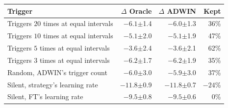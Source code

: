 \begin{tabular}{@{}lrrr@{}}
\toprule
Trigger & $\Delta$ Oracle & $\Delta$ ADWIN & Kept \\
\midrule
Triggers $20$ times at equal intervals & $-6.1${\tiny\phantom{0}$\pm$1.4}\rlap{$^{\downarrow}$} & $-6.0${\tiny\phantom{0}$\pm$1.3}\rlap{$^{\downarrow}$} & 36\% \\
Triggers $10$ times at equal intervals & $-5.1${\tiny\phantom{0}$\pm$2.0}\rlap{$^{\downarrow}$} & $-5.1${\tiny\phantom{0}$\pm$1.9}\rlap{$^{\downarrow}$} & 47\% \\
Triggers $5$ times at equal intervals & $-3.6${\tiny\phantom{0}$\pm$2.4}\rlap{$^{\downarrow}$} & $-3.6${\tiny\phantom{0}$\pm$2.1}\rlap{$^{\downarrow}$} & 62\% \\
Triggers $3$ times at equal intervals & $-6.2${\tiny\phantom{0}$\pm$1.7}\rlap{$^{\downarrow}$} & $-6.2${\tiny\phantom{0}$\pm$1.9}\rlap{$^{\downarrow}$} & 35\% \\
Random, ADWIN's trigger count & $-6.0${\tiny\phantom{0}$\pm$3.0}\rlap{$^{\downarrow}$} & $-5.9${\tiny\phantom{0}$\pm$3.0}\rlap{$^{\downarrow}$} & 37\% \\
\midrule
Silent, strategy's learning rate & $-11.8${\tiny\phantom{0}$\pm$0.9}\rlap{$^{\downarrow}$} & $-11.8${\tiny\phantom{0}$\pm$0.7}\rlap{$^{\downarrow}$} & $-24$\% \\
Silent, FT's learning rate & $-9.5${\tiny\phantom{0}$\pm$0.8}\rlap{$^{\downarrow}$} & $-9.5${\tiny\phantom{0}$\pm$0.6}\rlap{$^{\downarrow}$} & 0\% \\
\bottomrule
\end{tabular}
